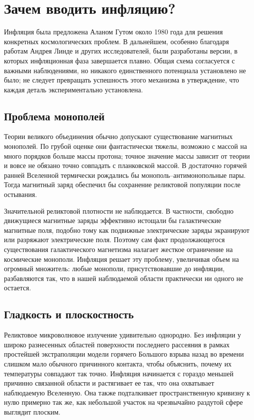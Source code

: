 \section{Зачем вводить инфляцию?}

Инфляция была предложена Аланом Гутом около 1980 года для решения конкретных космологических проблем. В дальнейшем, особенно благодаря работам Андрея Линде и других исследователей, были разработаны версии, в которых инфляционная фаза завершается плавно. Общая схема согласуется с важными наблюдениями, но никакого единственного потенциала установлено не было; не следует превращать успешность этого механизма в утверждение, что каждая деталь экспериментально установлена.

\subsection{Проблема монополей}

Теории великого объединения обычно допускают существование магнитных монополей. По грубой оценке они фантастически тяжелы, возможно с массой на много порядков больше массы протона; точное значение массы зависит от теории и вовсе не обязано точно совпадать с планковской массой. В достаточно горячей ранней Вселенной термически рождались бы монополь--антимонопольные пары. Тогда магнитный заряд обеспечил бы сохранение реликтовой популяции после остывания.

Значительной реликтовой плотности не наблюдается. В частности, свободно движущиеся магнитные заряды эффективно истощали бы галактические магнитные поля, подобно тому как подвижные электрические заряды экранируют или разряжают электрические поля. Поэтому сам факт продолжающегося существования галактического магнетизма налагает жесткое ограничение на космические монополи. Инфляция решает эту проблему, увеличивая объем на огромный множитель: любые монополи, присутствовавшие до инфляции, разбавляются так, что в нашей наблюдаемой области практически ни одного не остается.

\subsection{Гладкость и плоскостность}

Реликтовое микроволновое излучение удивительно однородно. Без инфляции у широко разнесенных областей поверхности последнего рассеяния в рамках простейшей экстраполяции модели горячего Большого взрыва назад во времени слишком мало обычного причинного контакта, чтобы объяснить, почему их температуры совпадают так точно. Инфляция начинается с гораздо меньшей причинно связанной области и растягивает ее так, что она охватывает наблюдаемую Вселенную. Она также подталкивает пространственную кривизну к нулю примерно так же, как небольшой участок на чрезвычайно раздутой сфере выглядит плоским.

